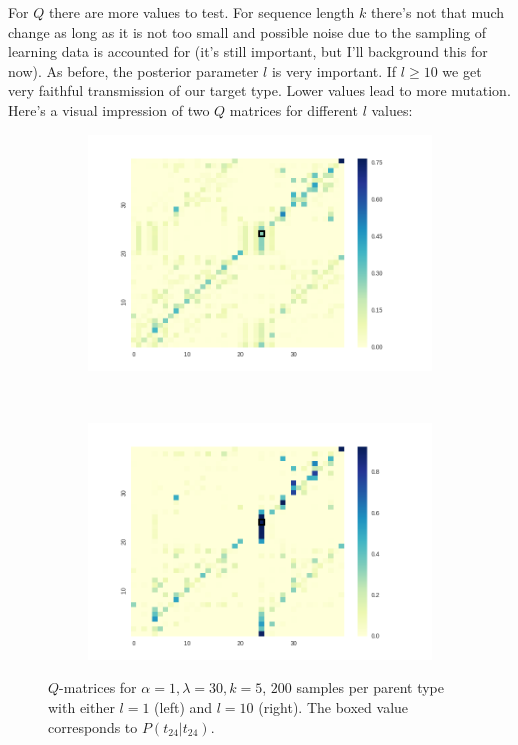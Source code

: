\documentclass[a4paper]{article}
\begin{document}
For $Q$ there are more values to test. For sequence length $k$ there's not that much change as long as it is not too small and possible noise due to the sampling of learning data is accounted for (it's still important, but I'll background this for now). As before, the posterior parameter $l$ is very important. If $l \geq 10$ we get very faithful transmission of our target type. Lower values lead to more mutation. Here's a visual impression of two $Q$ matrices for different $l$ values:
\begin{figure}[h!]
  \centering
  \begin{subfigure}[b]{0.45\textwidth}
    \includegraphics[scale=0.4]{../code-LOT-extension/plots/q-l30-a1-k5-l1-meTrue.png}
  \end{subfigure}
  ~
   \begin{subfigure}[b]{0.45\textwidth}
    \includegraphics[scale=0.4]{../code-LOT-extension/plots/q-l30-a1-k5-l10-meTrue.png}
  \end{subfigure}
  \caption{$Q$-matrices for $\alpha = 1, \lambda = 30, k = 5$, $200$ samples per parent type with either $l = 1$ (left) and $l = 10$ (right). The boxed value corresponds to $P(t_{24} | t_{24})$.}
  \label{fig:q-matrices}
\end{figure}
\end{document}
